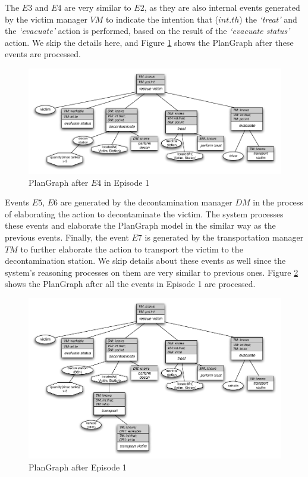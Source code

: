 The $E3$ and $E4$ are very similar to $E2$, as they are also internal events generated by the victim manager $VM$ to indicate the intention that ($int.th$) the \emph{`treat'} and the \emph{`evacuate'} action is performed, based on the result of the \emph{`evacuate status'} action. We skip the details here, and Figure \ref{fig:plangraph_ep1_e4} shows the PlanGraph after these events are processed.

\begin{figure}[htbp] %
	\centering
	\includegraphics[width=5.8in]{plangraph_ep1_e4.pdf} 
	\caption{PlanGraph after $E4$ in Episode 1}
	\label{fig:plangraph_ep1_e4}
\end{figure}

Events $E5$, $E6$ are generated by the decontamination manager $DM$ in the process of elaborating the action to decontaminate the victim. The system processes these events and elaborate the PlanGraph model in the similar way as the previous events. Finally, the event $E7$ is generated by the transportation manager $TM$ to further elaborate the action to transport the victim to the decontamination station. We skip details about these events as well since the system's reasoning processes on them are very similar to previous ones. Figure \ref{fig:plangraph_ep1_e7} shows the PlanGraph after all the events in Episode 1 are processed.

\begin{figure}[htbp] %
	\centering
	\includegraphics[width=5.8in]{plangraph_ep1_e7.pdf} 
	\caption{PlanGraph after Episode 1}
	\label{fig:plangraph_ep1_e7}
\end{figure}

